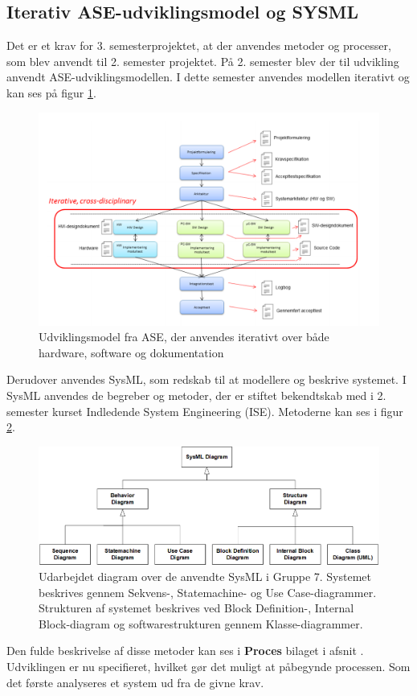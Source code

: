 \documentclass[Rapport/Rapport_main.tex]{subfiles}
\begin{document}
\subsection{Iterativ ASE-udviklingsmodel og SYSML}
Det er et krav for 3. semesterprojektet, at der anvendes metoder og processer, som blev anvendt til 2. semester projektet. På 2. semester blev der til udvikling anvendt ASE-udviklingsmodellen. I dette semester anvendes modellen iterativt og kan ses på figur \ref{fig:rap_ase_model}.
\begin{figure}[H]
    \centering
    \includegraphics[width=\textwidth]{Processdokument/graphics/ASE_model.png}
    \caption{Udviklingsmodel fra ASE\cite{vejledning_prj3}, der anvendes iterativt over både hardware, software og dokumentation}
    \label{fig:rap_ase_model}
\end{figure}
Derudover anvendes SysML, som redskab til at modellere og beskrive systemet. I SysML anvendes de begreber og metoder, der er stiftet bekendtskab med i 2. semester kurset Indledende System Engineering (ISE). Metoderne kan ses i figur \ref{fig:rap_sysml_usage}.
\begin{figure}[H]
    \centering
    \includegraphics[width=\textwidth]{Processdokument/graphics/Sysml_usage.png}
    \caption{Udarbejdet diagram over de anvendte SysML i Gruppe 7. Systemet beskrives gennem Sekvens-, Statemachine- og Use Case-diagrammer. Strukturen af systemet beskrives ved Block Definition-, Internal Block-diagram og softwarestrukturen gennem Klasse-diagrammer. }
    \label{fig:rap_sysml_usage}
\end{figure}
Den fulde beskrivelse af disse metoder kan ses i \textbf{Proces} bilaget i afsnit .\\

Udviklingen er nu specifieret, hvilket gør det muligt at påbegynde processen. Som det første analyseres et system ud fra de givne krav. 
\end{document}
